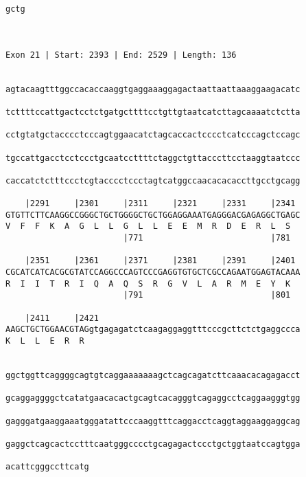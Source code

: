 \documentclass{article}
\begin{document}
\begin{Verbatim}
gctg
    
    
 
Exon 21 | Start: 2393 | End: 2529 | Length: 136


agtacaagtttggccacaccaaggtgaggaaaggagactaattaattaaaggaagacatc
                                                            
tcttttccattgactcctctgatgcttttcctgttgtaatcatcttagcaaaatctctta
                                                            
cctgtatgctacccctcccagtggaacatctagcaccactcccctcatcccagctccagc
                                                            
tgccattgacctcctccctgcaatccttttctaggctgttacccttcctaaggtaatccc
                                                            
caccatctctttccctcgtacccctccctagtcatggccaacacacaccttgcctgcagg
                                                            
    |2291     |2301     |2311     |2321     |2331     |2341 
GTGTTCTTCAAGGCCGGGCTGCTGGGGCTGCTGGAGGAAATGAGGGACGAGAGGCTGAGC
V  F  F  K  A  G  L  L  G  L  L  E  E  M  R  D  E  R  L  S  
                        |771                          |781  
  
    |2351     |2361     |2371     |2381     |2391     |2401 
CGCATCATCACGCGTATCCAGGCCCAGTCCCGAGGTGTGCTCGCCAGAATGGAGTACAAA
R  I  I  T  R  I  Q  A  Q  S  R  G  V  L  A  R  M  E  Y  K  
                        |791                          |801  
  
    |2411     |2421                                         
AAGCTGCTGGAACGTAGgtgagagatctcaagaggaggtttcccgcttctctgaggccca
K  L  L  E  R  R                                            
                                                            
  
ggctggttcaggggcagtgtcaggaaaaaaagctcagcagatcttcaaacacagagacct
                                                            
gcaggaggggctcatatgaacacactgcagtcacagggtcagaggcctcaggaagggtgg
                                                            
gagggatgaaggaaatgggatattcccaaggtttcaggacctcaggtaggaaggaggcag
                                                            
gaggctcagcactcctttcaatgggcccctgcagagactccctgctggtaatccagtgga
                                                            
acattcgggccttcatg
                 
                 
 

\end{Verbatim}
\end{document}
